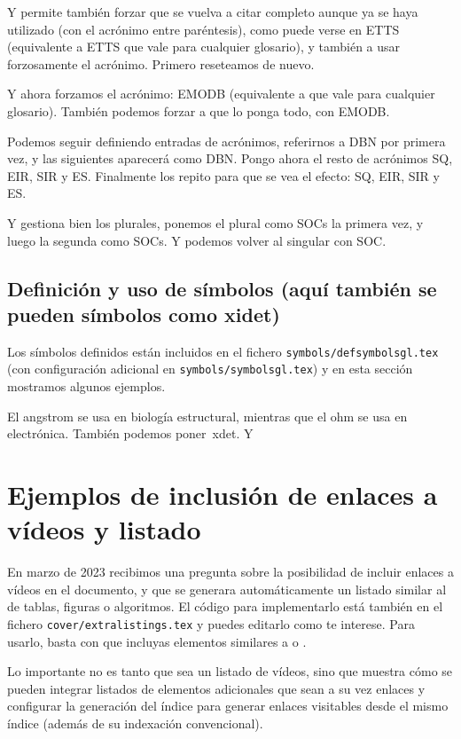 {  Y permite también forzar que se vuelva a citar completo aunque ya se haya utilizado (con el acrónimo entre paréntesis), como puede verse en \acl{ETTS} (equivalente a \glsdesc{ETTS} que vale para cualquier glosario), y también a usar forzosamente el acrónimo. Primero reseteamos de nuevo.

  \glsresetall[acronym]

  Y ahora forzamos el acrónimo: \acs{EMODB} (equivalente a  que vale para cualquier glosario). También podemos forzar a que lo ponga todo, con \acf{EMODB}.


  Podemos seguir definiendo entradas de acrónimos, referirnos a \ac{DBN} por primera vez, y las siguientes aparecerá como \ac{DBN}. Pongo ahora el resto de acrónimos \ac{SQ}, \ac{EIR}, \ac{SIR} y \ac{ES}. Finalmente los repito para que se vea el efecto: \ac{SQ}, \ac{EIR}, \ac{SIR} y \ac{ES}.

  Y gestiona bien los plurales, ponemos el plural como \acp{SOC} la primera vez, y luego la segunda como \acp{SOC}. Y podemos volver al singular con \ac{SOC}.


  \subsection{Definición y uso de símbolos (aquí también se pueden símbolos como \ac{xidet})}
  \label{sec:simbolos}

  Los símbolos definidos están incluidos en el fichero \texttt{symbols/defsymbolsgl.tex} (con configuración adicional en \texttt{symbols/symbolsgl.tex}) y en esta sección mostramos algunos ejemplos.

  El \ac{angstrom} se usa en biología estructural, mientras que el \ac{ohm} se usa en electrónica. También podemos poner~\ac{xdet}. Y


  \section{Ejemplos de inclusión de enlaces a vídeos y listado}
  \label{sec:videolink}

  En marzo de 2023 recibimos una pregunta sobre la posibilidad de incluir enlaces a vídeos en el documento, y que se generara automáticamente un listado similar al de tablas, figuras o algoritmos. El código para implementarlo está también en el fichero \texttt{cover/extralistings.tex} y puedes editarlo como te interese. Para usarlo, basta con que incluyas elementos similares a  o .

  Lo importante no es tanto que sea un listado de vídeos, sino que muestra cómo se pueden integrar listados de elementos adicionales que sean a su vez enlaces y configurar la generación del índice para generar enlaces visitables desde el mismo índice (además de su indexación convencional).
}
